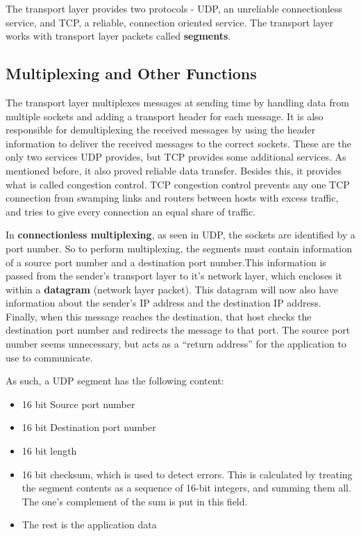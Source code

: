 \documentclass[12pt,letterpaper]{article}
\theoremstyle{definition}
\begin{document}
The transport layer provides two protocols - UDP, an unreliable connectionless service, and TCP, a reliable, connection oriented service. The transport layer works with transport layer packets called \textbf{segments}. 

\subsection{Multiplexing and Other Functions}

The transport layer multiplexes messages at sending time by handling data from multiple sockets and adding a transport header for each message. It is also responsible for demultiplexing the received messages by using the header information to deliver the received messages to the correct sockets. These are the only two services UDP provides, but TCP provides some additional services. As mentioned before, it also proved reliable data transfer. Besides this, it provides what is called congestion control. TCP congestion control prevents any one TCP connection from swamping links and routers between hosts with excess traffic, and tries to give every connection an equal share of traffic.

In \textbf{connectionless multiplexing}, as seen in UDP, the sockets are identified by a port number. So to perform multiplexing, the segments must contain information of a source port number and a destination port number.This information is passed from the sender's transport layer to it's network layer, which encloses it within a \textbf{datagram}  (network layer packet). This datagram will now also have information about the sender's IP address and the destination IP address. Finally, when this message reaches the destination, that host checks the destination port number and redirects the message to that port. The source port number seems unnecessary, but acts as a ``return address'' for the application to use to communicate.

As such, a UDP segment has the following content:

\begin{itemize}
  \item 16 bit Source port number
  \item 16 bit Destination port number
  \item 16 bit length
  \item 16 bit checksum, which is used to detect errors. This is calculated by treating the segment contents as a sequence of 16-bit integers, and summing them all. The one's complement of the sum is put in this field.
  \item The rest is the application data
\end{itemize}
\end{document}
